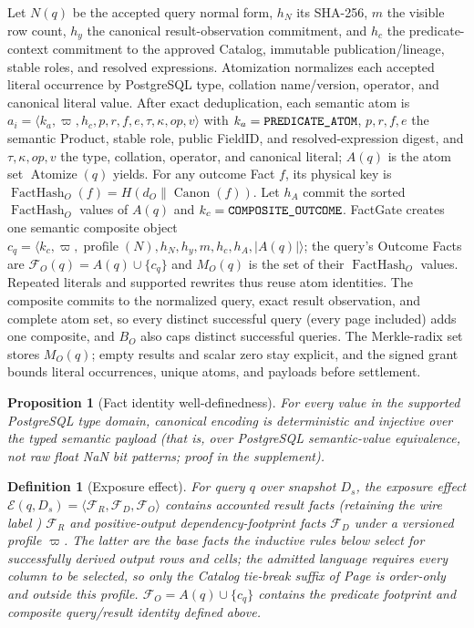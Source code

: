 \documentclass[10pt,journal,compsoc]{IEEEtran}
\newcommand{\system}{FactGate\xspace}
\newcommand{\code}[1]{\texttt{\detokenize{#1}}}
\newcommand{\facts}{\mathcal{F}}
\newcommand{\effect}{\mathcal{E}}
\newtheorem{definition}{Definition}
\newtheorem{proposition}{Proposition}
\begin{document}
Let $N(q)$ be the accepted query normal form, $h_N$ its SHA-256, $m$ the
visible row count, $h_y$ the canonical result-observation commitment, and
$h_c$ the predicate-context commitment to the approved Catalog, immutable
publication/lineage, stable roles, and resolved expressions. Atomization
normalizes each accepted literal occurrence by PostgreSQL type, collation
name/version, operator, and canonical literal value. After exact
deduplication, each semantic atom is
$a_i=\langle k_a,\varpi,h_c,p,r,f,e,\tau,\kappa,op,v\rangle$ with
$k_a=\code{PREDICATE_ATOM}$, $p,r,f,e$ the semantic Product, stable role,
public FieldID, and resolved-expression digest, and $\tau,\kappa,op,v$ the
type, collation, operator, and canonical literal; $A(q)$ is the atom set
$\operatorname{Atomize}(q)$ yields. For any outcome Fact $f$, its physical key is
$\operatorname{FactHash}_O(f)=H(d_O\|\operatorname{Canon}(f))$.
Let $h_A$ commit the sorted $\operatorname{FactHash}_O$ values of $A(q)$ and
$k_c=\code{COMPOSITE_OUTCOME}$. \system creates one semantic composite object
$c_q=\langle k_c,\varpi,\operatorname{profile}(N),h_N,h_y,m,h_c,h_A,|A(q)|\rangle$;
the query's Outcome Facts are $\facts_O(q)=A(q)\cup\{c_q\}$ and $M_O(q)$
is the set of their $\operatorname{FactHash}_O$ values.
Repeated literals and supported rewrites thus reuse atom identities. The
composite commits to the normalized query, exact result observation,
and complete atom set, so every distinct successful query (every page
included) adds one composite, and $B_O$ also caps distinct successful
queries. The Merkle-radix set stores $M_O(q)$; empty results and scalar
zero stay explicit, and the signed grant bounds literal occurrences, unique
atoms, and payloads before settlement.

\begin{proposition}[Fact identity well-definedness]
\label{thm:fact-identity}
For every value in the supported PostgreSQL type domain, canonical encoding
is deterministic and injective over the typed semantic payload (that is, over
PostgreSQL semantic-value equivalence, not raw float NaN bit patterns; proof
in the supplement).
\end{proposition}

\begin{definition}[Exposure effect]
For query $q$ over snapshot $D_s$, the exposure effect
$\effect(q,D_s)=\langle \facts_R,\facts_D,\facts_O\rangle$ contains accounted
result facts (retaining the wire label \code{release})
$\facts_R$ and positive-output dependency-footprint facts $\facts_D$ under a
versioned profile $\varpi$.  The latter are the base facts the inductive rules
below select for successfully derived output rows and cells; the admitted language
requires every \code{ORDER BY} column to be selected, so only the Catalog
tie-break suffix of Page is order-only and outside this profile.
$\facts_O=A(q)\cup\{c_q\}$ contains the predicate footprint and composite
query/result identity defined above.
\end{definition}
\end{document}
